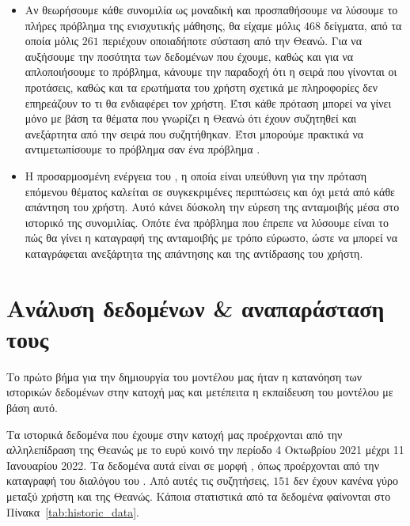 \begin{itemize}
    \item Αν θεωρήσουμε κάθε συνομιλία ως μοναδική και προσπαθήσουμε να λύσουμε το πλήρες πρόβλημα της ενισχυτικής μάθησης, θα είχαμε μόλις $468$ δείγματα, από τα οποία μόλις $261$ περιέχουν οποιαδήποτε σύσταση από την Θεανώ. Για να αυξήσουμε την ποσότητα των δεδομένων που έχουμε, καθώς και για να απλοποιήσουμε το πρόβλημα, κάνουμε την παραδοχή ότι η σειρά που γίνονται οι προτάσεις, καθώς και τα ερωτήματα του χρήστη σχετικά με πληροφορίες δεν επηρεάζουν το τι θα ενδιαφέρει τον χρήστη. Έτσι κάθε πρόταση μπορεί να γίνει μόνο με βάση τα θέματα που γνωρίζει η Θεανώ ότι έχουν συζητηθεί και ανεξάρτητα από την σειρά που συζητήθηκαν. Έτσι μπορούμε πρακτικά να αντιμετωπίσουμε το πρόβλημα σαν ένα πρόβλημα .
    \item Η προσαρμοσμένη ενέργεια  του , η οποία είναι υπεύθυνη για την πρόταση επόμενου θέματος καλείται σε συγκεκριμένες περιπτώσεις και όχι μετά από κάθε απάντηση του χρήστη. Αυτό κάνει δύσκολη την εύρεση της ανταμοιβής μέσα στο ιστορικό της συνομιλίας. Οπότε ένα πρόβλημα που έπρεπε να λύσουμε είναι το πώς θα γίνει η καταγραφή της ανταμοιβής με τρόπο εύρωστο, ώστε να μπορεί να καταγράφεται ανεξάρτητα της απάντησης και της αντίδρασης του χρήστη.
\end{itemize}

\section{Ανάλυση δεδομένων \& αναπαράσταση τους}

Το πρώτο βήμα για την δημιουργία του μοντέλου μας ήταν η κατανόηση των ιστορικών δεδομένων στην κατοχή μας και μετέπειτα η εκπαίδευση του μοντέλου με βάση αυτό.

Τα ιστορικά δεδομένα που έχουμε στην κατοχή μας προέρχονται από την αλληλεπίδραση της Θεανώς με το ευρύ κοινό την περίοδο 4 Οκτωβρίου 2021 μέχρι 11 Ιανουαρίου 2022. Τα δεδομένα αυτά είναι σε μορφή , όπως προέρχονται από την καταγραφή του διαλόγου του . Από αυτές τις συζητήσεις, $151$ δεν έχουν κανένα γύρο μεταξύ χρήστη και της Θεανώς. Κάποια στατιστικά από τα δεδομένα φαίνονται στο Πίνακα~\ref{tab:historic_data}.

